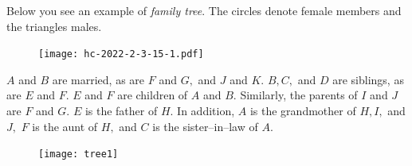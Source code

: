 \begin{multicols}{2}
	Below you see an example of \textit{family tree}.
	The circles denote female members and the triangles males.
	\begin{figure}[H]
		\vspace*{-5pt}
		\centering
		\captionsetup{labelformat= empty, justification=centering}
		\texttt{[image: hc-2022-2-3-15-1.pdf]}
		\vspace*{-10pt}
	\end{figure}
	$A$ and $B$ are married, as are $F$ and $G,$ and $J$ and $K.$
	\vskip 0.1cm
	$B, C,$ and $D$ are siblings, as are $E$ and $F.$
	$E$ and $F$ are children of $A$ and $B.$
	\vskip 0.1cm
	Similarly, the parents of $I$ and $J$ are $F$ and $G.$
	$E$ is the father of $H.$
	\vskip 0.1cm
	In addition, $A$ is the grandmother of $H, I,$ and $J,$
	$F$ is the aunt of $H,$ and $C$ is the sister--in--law of $A.$
	\begin{figure}[H]
		\vspace*{-5pt}
		\centering
		\captionsetup{labelformat= empty, justification=centering}
		\texttt{[image: tree1]}
	\end{figure}
	
	\vspace*{0.1pt}
	

\end{multicols}
